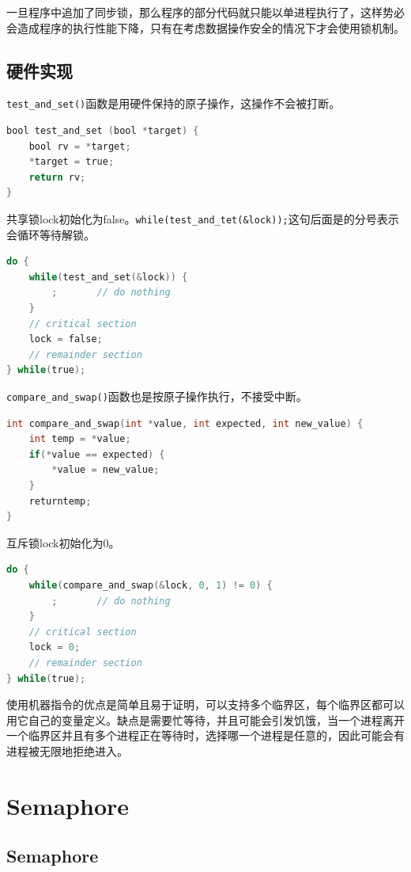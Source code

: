 一旦程序中追加了同步锁，那么程序的部分代码就只能以单进程执行了，这样势必会造成程序的执行性能下降，只有在考虑数据操作安全的情况下才会使用锁机制。

\subsection{硬件实现}

\lstinline|test_and_set()|函数是用硬件保持的原子操作，这操作不会被打断。

\begin{lstlisting}[language=C]
bool test_and_set (bool *target) {
	bool rv = *target;
	*target = true;
	return rv;
}
\end{lstlisting}

共享锁lock初始化为false。\lstinline|while(test_and_tet(&lock));|这句后面是的分号表示会循环等待解锁。

\begin{lstlisting}[language=C]
do {
	while(test_and_set(&lock)) {
		;		// do nothing
	}
	// critical section
	lock = false;
	// remainder section
} while(true);
\end{lstlisting}

\lstinline|compare_and_swap()|函数也是按原子操作执行，不接受中断。

\begin{lstlisting}[language=C]
int compare_and_swap(int *value, int expected, int new_value) {
	int temp = *value;
	if(*value == expected) {
		*value = new_value;
	}
	returntemp;
}
\end{lstlisting}

互斥锁lock初始化为0。

\begin{lstlisting}[language=C]
do {
	while(compare_and_swap(&lock, 0, 1) != 0) {
		;		// do nothing
	}
	// critical section
	lock = 0;
	// remainder section
} while(true);
\end{lstlisting}

使用机器指令的优点是简单且易于证明，可以支持多个临界区，每个临界区都可以用它自己的变量定义。缺点是需要忙等待，并且可能会引发饥饿，当一个进程离开一个临界区并且有多个进程正在等待时，选择哪一个进程是任意的，因此可能会有进程被无限地拒绝进入。

\newpage

\section{Semaphore}

\subsection{Semaphore}

